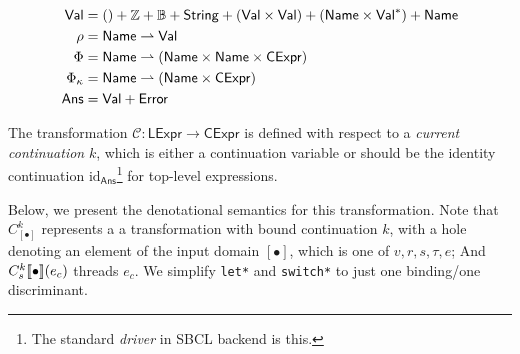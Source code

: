 \documentclass[a4paper, 11pt]{article}
\theoremstyle{remark}\newtheorem*{remark}{Remark}
\theoremstyle{definition}\newtheorem*{definition}{Definition}
\begin{document}
\begin{align*}
\mathsf{Val} &= () + \mathbb{Z} + \mathbb{B} + \mathsf{String} + (\mathsf{Val} \times \mathsf{Val}) + (\mathsf{Name} \times \mathsf{Val}^*) + \mathsf{Name} \\
\rho &= \mathsf{Name} \rightharpoonup \mathsf{Val} \\
\Phi &= \mathsf{Name} \rightharpoonup (\mathsf{Name} \times \mathsf{Name} \times \mathsf{CExpr}) \\
\Phi_\kappa &= \mathsf{Name} \rightharpoonup (\mathsf{Name} \times \mathsf{CExpr}) \\
\mathsf{Ans} &= \mathsf{Val} + \mathsf{Error}
\end{align*}

The transformation $\mathcal{C} :  \mathsf{LExpr} \to \mathsf{CExpr}$ is defined
with respect to a \emph{current continuation} $k$, which is either a continuation
variable or should be the identity continuation $\mathrm{id}_\mathsf{Ans}$\footnote{
The standard \emph{driver} in SBCL backend is this.
}
for top-level expressions.

Below, we present the denotational semantics for this transformation. Note that $C^k_{[\bullet]}$ represents a
a transformation with bound continuation $k$, with a hole denoting an element of the input domain $[\bullet]$, which is one of
$v, r, s, \tau, e$; And $C^k_s\llbracket \bullet \rrbracket(e_c)$ threads $e_c$. We simplify \texttt{let*} and \texttt{switch*} to
just one binding/one discriminant.
\end{document}
